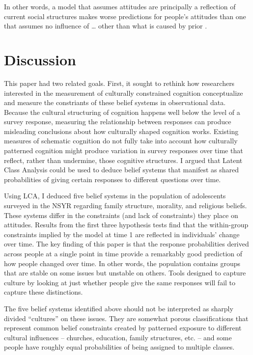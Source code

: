 \documentclass[12pt,]{article}
\begin{document}
In other words, a model that assumes attitudes are principally a reflection of current social structures makes worse predictions for people's attitudes than one that assumes no influence of \ldots{} other than what is caused by prior .

\hypertarget{discussion}{%
\section{Discussion}\label{discussion}}

This paper had two related goals. First, it sought to rethink how researchers interested in the measurement of culturally constrained cognition conceptualize and measure the constriants of these belief systems in observational data. Because the cultural structuring of cognition happens well below the level of a survey response, measuring the relationship between responses can produce misleading conclusions about how culturally shaped cognition works. Existing measures of schematic cognition do not fully take into account how culturally patterned cognition might produce variation in survey responses over time that reflect, rather than undermine, those cognitive structures. I argued that Latent Class Analysis could be used to deduce belief systems that manifest as shared probabilities of giving certain responses to different questions over time.

Using LCA, I deduced five belief systems in the population of adolescents surveyed in the NSYR regarding family structure, morality, and religious beliefs. These systems differ in the constraints (and lack of constraints) they place on attitudes. Results from the first three hypothesis tests find that the within-group constraints implied by the model at time 1 are reflected in individuals' change over time. The key finding of this paper is that the response probabilities derived across people at a single point in time provide a remarkably good prediction of how people changed over time. In other words, the population contains groups that are stable on some issues but unstable on others. Tools designed to capture culture by looking at just whether people give the same responses will fail to capture these distinctions.

The five belief systems identified above should not be interpreted as sharply divided ``cultures'' on these issues. They are somewhat porous classifications that represent common belief constraints created by patterned exposure to different cultural influences -- churches, education, family structures, etc. -- and some people have roughly equal probabilities of being assigned to multiple classes.
\end{document}
